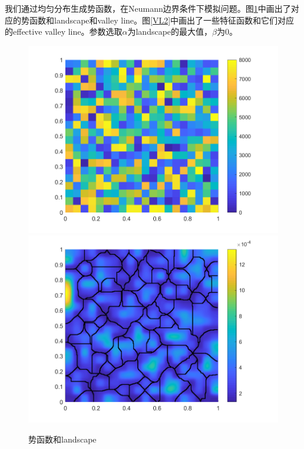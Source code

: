 \documentclass[12pt,a4paper]{article}
\begin{document}
我们通过均匀分布生成势函数，在Neumann边界条件下模拟问题。图\ref{VL1}中画出了对应的势函数和landscape和valley line。图\ref{VL2}中画出了一些特征函数和它们对应的effective valley line。参数选取$\alpha$为landscape的最大值，$\beta$为0。

\begin{figure}[htbp]
\centering
\includegraphics[width=0.3\linewidth]{valley/V}
\includegraphics[width=0.3\linewidth]{valley/W}
\caption{势函数和landscape}
\label{VL1}
\end{figure}
\end{document}
